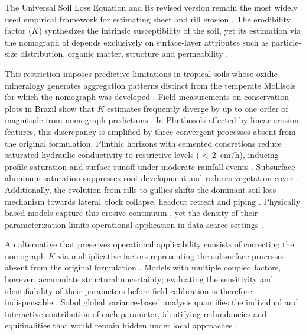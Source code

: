 \documentclass[pdflatex,sn-basic,referee,lineno]{sn-jnl}
\begin{document}
The Universal Soil Loss Equation and its revised version \citep{wischmeier_smith_1978,renard_et_al_1997} remain the most widely used empirical framework for estimating sheet and rill erosion \citep{alewell_et_al_2019}. The erodibility factor ($K$) synthesizes the intrinsic susceptibility of the soil, yet its estimation via the nomograph of \citet{wischmeier_et_al_1971} depends exclusively on surface-layer attributes such as particle-size distribution, organic matter, structure and permeability \citep{roemkens_et_al_1997}.

This restriction imposes predictive limitations in tropical soils whose oxidic mineralogy generates aggregation patterns distinct from the temperate Mollisols for which the nomograph was developed \citep{alewell_et_al_2019,cassol_et_al_2023}. Field measurements on conservation plots in Brazil show that $K$ estimates frequently diverge by up to one order of magnitude from nomograph predictions \citep{silva_et_al_2009,lafayette_cantalice_coutinho_2011}. In Plinthosols affected by linear erosion features, this discrepancy is amplified by three convergent processes absent from the original formulation. Plinthic horizons with cemented concretions reduce saturated hydraulic conductivity to restrictive levels ($<$\,2~cm/h), inducing profile saturation and surface runoff under moderate rainfall events \citep{wang_et_al_2020,embrapa_2018,horton_1933,bertoni_lombardi_neto_2017}. Subsurface aluminum saturation suppresses root development and reduces vegetation cover \citep{gura_et_al_2022}. Additionally, the evolution from rills to gullies shifts the dominant soil-loss mechanism towards lateral block collapse, headcut retreat and piping \citep{poesen_2018,poesen_et_al_2003,kirkby_bracken_2009,vanmaercke_et_al_2021}. Physically based models capture this erosive continuum \citep{nearing_et_al_1989,sidorchuk_2006}, yet the density of their parameterization limits operational application in data-scarce settings \citep{wilkinson_et_al_2024}.

An alternative that preserves operational applicability consists of correcting the nomograph $K$ via multiplicative factors representing the subsurface processes absent from the original formulation \citep{alewell_et_al_2019}. Models with multiple coupled factors, however, accumulate structural uncertainty; evaluating the sensitivity and identifiability of their parameters before field calibration is therefore indispensable \citep{saltelli_et_al_2004}. Sobol global variance-based analysis quantifies the individual and interactive contribution of each parameter, identifying redundancies and equifinalities that would remain hidden under local approaches \citep{sobol_2001,francois_et_al_2024}.
\end{document}
